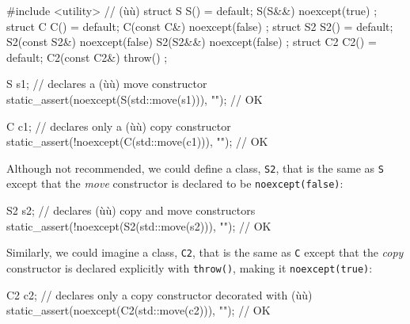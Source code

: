 \begin{emcppshiddenlisting}[emcppsbatch=e12]
#include <utility>  // (ù{}ù)
struct S {
    S() = default;
    S(S&&) noexcept(true) {}
};
struct C {
    C() = default;
    C(const C&) noexcept(false) {}
};
struct S2 {
    S2() = default;
    S2(const S2&) noexcept(false) {}
    S2(S2&&) noexcept(false) {}
};
struct C2 {
    C2() = default;
    C2(const C2&) throw() {}
};
\end{emcppshiddenlisting}
\begin{emcppslisting}[emcppsbatch=e12]
S s1;  // declares a (ù{}ù) move constructor
static_assert(noexcept(S(std::move(s1))), "");    // OK

C c1;  // declares only a (ù{}ù) copy constructor
static_assert(!noexcept(C(std::move(c1))), "");   // OK
\end{emcppslisting}
    

\noindent Although not recommended, we could define a class, \lstinline!S2!, that is
the same as \lstinline!S! except that the \emph{move} constructor is
declared to be \lstinline!noexcept(false)!:

\begin{emcppslisting}[emcppsbatch=e12]
S2 s2;  // declares (ù{}ù) copy and move constructors
static_assert(!noexcept(S2(std::move(s2))), "");  // OK
\end{emcppslisting}
    

\noindent Similarly, we could imagine a class, \lstinline!C2!, that is the same as
\lstinline!C! except that the \emph{copy} constructor is declared
explicitly with \lstinline!throw()!, making it \lstinline!noexcept(true)!:

\begin{emcppslisting}[emcppsbatch=e12]
C2 c2;  // declares only a copy constructor decorated with (ù{}ù)
static_assert(noexcept(C2(std::move(c2))), "");   // OK
\end{emcppslisting}
    

